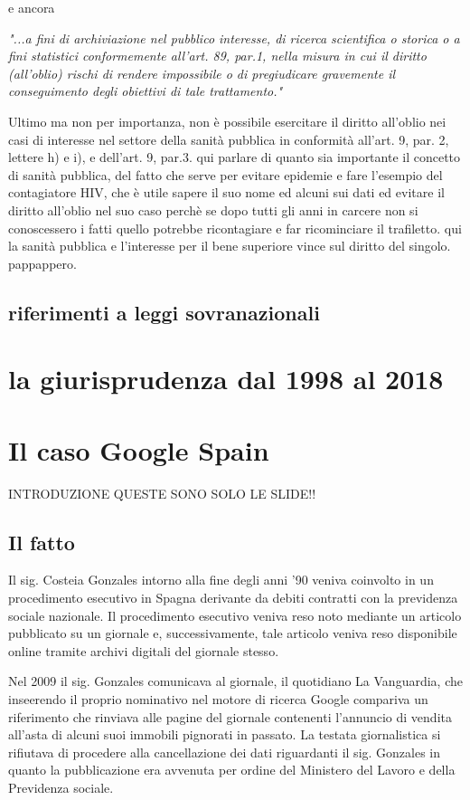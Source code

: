 e ancora

\textit{"...a fini di archiviazione nel pubblico interesse, di ricerca scientifica o storica o a fini statistici conformemente all'art. 89, par.1, nella misura in cui il diritto (all'oblio) rischi di rendere impossibile o di pregiudicare gravemente il conseguimento degli obiettivi di tale trattamento."}

Ultimo ma non per importanza, non è possibile esercitare il diritto all'oblio nei casi di interesse nel settore della sanità pubblica in conformità all'art. 9, par. 2, lettere h) e i), e dell'art. 9, par.3.
qui parlare di quanto sia importante il concetto di sanità pubblica, del fatto che serve per evitare epidemie e fare l'esempio del contagiatore HIV, che è utile sapere il suo nome ed alcuni sui dati ed evitare il diritto all'oblio nel suo caso perchè se dopo tutti gli anni in carcere non si conoscessero i fatti quello potrebbe ricontagiare e far ricominciare il trafiletto. qui la sanità pubblica e l'interesse per il bene superiore vince sul diritto del singolo. pappappero.

\subsection{riferimenti a leggi sovranazionali}

\section{la giurisprudenza dal 1998 al 2018}


\section{Il caso Google Spain}
INTRODUZIONE
QUESTE SONO SOLO LE SLIDE!!
\subsection{Il fatto}
Il sig. Costeia Gonzales intorno alla fine degli anni '90 veniva coinvolto in un procedimento esecutivo in Spagna derivante da debiti contratti con la previdenza sociale nazionale. Il procedimento esecutivo veniva reso noto mediante un articolo pubblicato su un giornale e, successivamente, tale articolo veniva reso disponibile online tramite archivi digitali del giornale stesso. 

Nel 2009 il sig. Gonzales comunicava al giornale, il quotidiano La Vanguardia, che inseerendo il proprio nominativo nel motore di ricerca Google compariva  un riferimento che rinviava alle pagine del giornale contenenti l'annuncio di vendita all'asta di alcuni suoi immobili pignorati in passato. La testata giornalistica si rifiutava di procedere alla cancellazione dei dati riguardanti il sig. Gonzales in quanto la pubblicazione era avvenuta per ordine del Ministero del Lavoro e della Previdenza sociale.

